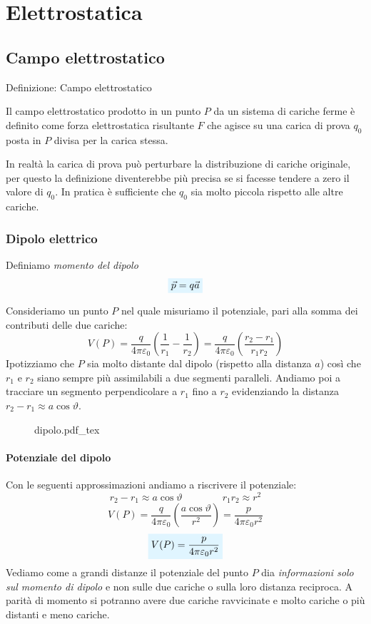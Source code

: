 \documentclass[x11names]{report}
\newcommand{\definizione}[2]{
	\begin{center}
		\fboxsep11pt
		\colorbox{myblue}{\begin{minipage}{5.75in}
				\begin{blues}{Definizione: #1}
					#2
				\end{blues}
		\end{minipage}}
	\end{center}
}
\newcommand{\incfig}[1]{%
	{#1.pdf_tex}
}
\newcommand{\viola}[1]{%
	\colorbox{myblue}{$\displaystyle #1$}
}
\begin{document}
	

\tableofcontents
\newpage
	
\chapter{Elettrostatica}
\section{Campo elettrostatico}
\definizione{Campo elettrostatico}{
Il campo elettrostatico prodotto in un punto \(P\) da un sistema di cariche ferme è definito come forza elettrostatica risultante \(F\) che agisce su una carica di prova \(q_0\) posta in \(P\) divisa per la carica stessa.
}
In realtà la carica di prova può perturbare la distribuzione di cariche originale, per questo la definizione diventerebbe più precisa se si facesse tendere a zero il valore di \(q_0\). In pratica è sufficiente che \(q_0\) sia molto piccola rispetto alle altre cariche.


\subsection{Dipolo elettrico}
Definiamo \textit{momento del dipolo}
\begin{equation}
	\viola{\vec{p} = q\vec{a}}
\end{equation}


Consideriamo un punto \(P\) nel quale misuriamo il potenziale, pari alla somma dei contributi delle due cariche:
\[
V(P) = \frac{q}{4\pi \varepsilon_0} \left(\frac{1}{r_1} - \frac{1}{r_2}\right) = \frac{q}{4\pi \varepsilon_0} \left(\frac{r_2 - r_1}{r_1r_2}\right)
\]
Ipotizziamo che \(P\) sia molto distante dal dipolo (rispetto alla distanza \(a\)) così che \(r_1\) e \(r_2\) siano sempre più assimilabili a due segmenti paralleli. Andiamo poi a tracciare un segmento perpendicolare a \(r_1\) fino a \(r_2\) evidenziando la distanza \(r_2 - r_1 \approx a\cos\vartheta\). 
\begin{figure}[h]
	\centering
	\incfig{dipolo}
\end{figure}
\subsubsection{Potenziale del dipolo}
Con le seguenti approssimazioni andiamo a riscrivere il potenziale:
\[
r_2 - r_1 \approx a\cos\vartheta \qquad \qquad r_1r_2 \approx r^2
\]
\[
V(P) = \frac{q}{4\pi \varepsilon_0} \left(\frac{a\cos\vartheta}{r^2}\right) = \frac{p}{4\pi \varepsilon_0 r^2}
\]
\begin{equation}
	\viola{V(P) =\frac{p}{4\pi \varepsilon_0 r^2}}
\end{equation}
Vediamo come a grandi distanze il potenziale del punto \(P\) dia \textit{informazioni solo sul momento di dipolo} e non sulle due cariche o sulla loro distanza reciproca. A parità di momento si potranno avere due cariche ravvicinate e molto cariche o più distanti e meno cariche.
\end{document}
